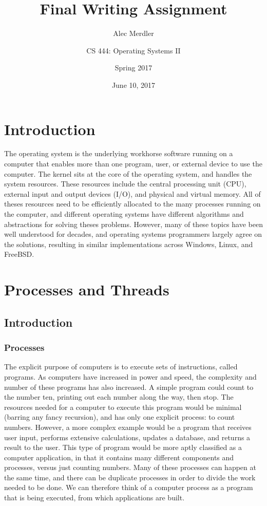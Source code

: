 \documentclass[letterpaper,draftclsnofoot,10pt,onecolumn,titlepage]{IEEEtran}\usepackage[margin=0.75in]{geometry}
\title{Final Writing Assignment}
\author{
	Alec Merdler\\
	\and
	CS 444: Operating Systems II\\
	\and
	Spring 2017\\
}
\date{June 10, 2017}
\begin{document}
\begin{titlepage}
\clearpage\maketitle
\thispagestyle{empty}

\maketitle
\end{titlepage}

\section{Introduction}
The operating system is the underlying workhorse software running on a computer that enables more than one program,
user, or external device to use the computer. The kernel sits at the core of the operating system, and handles the 
system resources. These resources include the central processing unit (CPU), external input and output devices (I/O),
and physical and virtual memory. All of theses resources need to be efficiently allocated to the many processes 
running on the computer, and different operating systems have different algorithms and abstractions for solving 
theses problems. However, many of these topics have been well understood for decades, and operating systems
programmers largely agree on the solutions, resulting in similar implementations across Windows, Linux, and FreeBSD.


\section{Processes and Threads}
    \subsection{Introduction}
        \subsubsection{Processes}
        The explicit purpose of computers is to execute sets of instructions, called programs. As computers have increased
        in power and speed, the complexity and number of these programs has also increased. A simple program could count
        to the number ten, printing out each number along the way, then stop. The resources needed for a computer to
        execute this program would be minimal (barring any fancy recursion), and has only one explicit process: to
        count numbers. However, a more complex example would be a program that receives user input, performs extensive
        calculations, updates a database, and returns a result to the user. This type of program would be more aptly
        classified as a computer application, in that it contains many different components and processes, versus just
        counting numbers. Many of these processes can happen at the same time, and there can be duplicate processes in
        order to divide the work needed to be done. We can therefore think of a computer process as a program that is
        being executed, from which applications are built.
\end{document}
